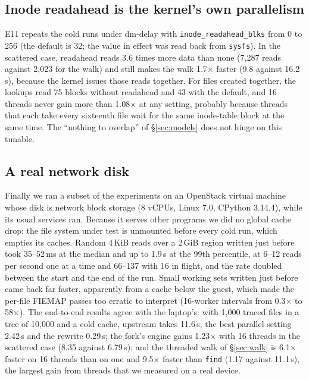 \subsection{Inode readahead is the kernel's own parallelism}
\label{sec:readahead}

E11 repeats the cold runs under dm-delay with \texttt{inode\_readahead\_blks} from 0
to 256 (the default is 32; the value in effect was read back from \texttt{sysfs}). In
the scattered case, readahead reads 3.6 times more data than none (7{,}287 reads
against 2{,}023 for the walk) and still makes the walk 1.7$\times$ faster (9.8 against
16.2\,s), because the kernel issues those reads together. For files created together,
the lookups read 75 blocks without readahead and 43 with the default, and 16 threads
never gain more than 1.08$\times$ at any setting, probably because threads that each
take every sixteenth file wait for the same inode-table block at the same time. The
``nothing to overlap'' of \S\ref{sec:models} does not hinge on this tunable.

\subsection{A real network disk}
\label{sec:realdisk}

Finally we ran a subset of the experiments on an OpenStack virtual machine whose disk
is network block storage (8 vCPUs, Linux 7.0, CPython 3.14.4), while its usual services
ran. Because it serves other programs we did no global cache drop: the file system under
test is unmounted before every cold run, which empties its caches. Random 4\,KiB reads
over a 2\,GiB region written just before took 35--52\,ms
at the median and up to 1.9\,s at the 99th percentile, at 6--12 reads per second one at
a time and 66--137 with 16 in flight, and the rate doubled between the start and the end
of the run. Small working sets written just before came back far faster, apparently
from a cache below the guest, which made the per-file FIEMAP passes too erratic to
interpret (16-worker intervals from 0.3$\times$ to 58$\times$). The end-to-end results agree with the laptop's:
with 1{,}000 traced files in a tree of 10{,}000 and a cold cache, upstream takes
11.6\,s, the best parallel setting 2.42\,s and the rewrite 0.29\,s; the fork's engine
gains 1.23$\times$ with 16 threads in the scattered case (8.35 against 6.79\,s); and the
threaded walk of \S\ref{sec:walk} is 6.1$\times$ faster on 16 threads than on one and
9.5$\times$ faster than \texttt{find} (1.17 against 11.1\,s), the largest gain from
threads that we measured on a real device.
